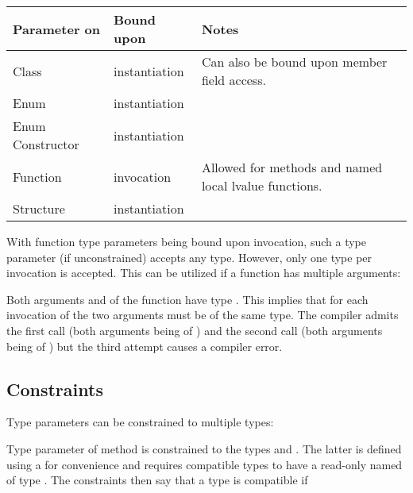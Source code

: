 \begin{center}
\begin{tabular}{| l | l | l |}
	\hline
	Parameter on & Bound upon & Notes \\ \hline
	Class & instantiation & Can also be bound upon member field access. \\
	Enum & instantiation & \\
	Enum Constructor & instantiation & \\
	Function & invocation & Allowed for methods and named local lvalue functions. \\
	Structure & instantiation & \\ \hline
\end{tabular}
\end{center}
With function type parameters being bound upon invocation, such a type parameter (if unconstrained) accepts any type. However, only one type per invocation is accepted. This can be utilized if a function has multiple arguments:


Both arguments  and  of the  function have type . This implies that for each invocation of  the two arguments must be of the same type. The compiler admits the first call (both arguments being of ) and the second call (both arguments being of ) but the third attempt causes a compiler error.


\subsection{Constraints}
\label{type-system-type-parameter-constraints}

Type parameters can be constrained to multiple types:

Type parameter  of method  is constrained to the types  and . The latter is defined using a  for convenience and requires compatible types to have a read-only  named  of type . The constraints then say that a type is compatible if

